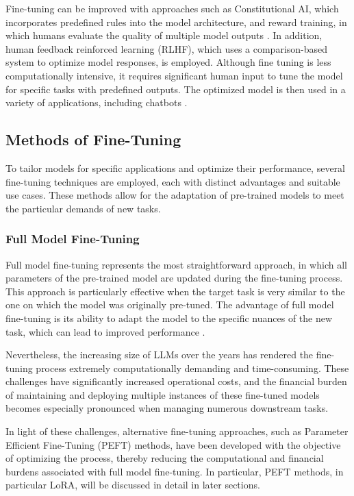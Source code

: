 Fine-tuning can be improved with approaches such as Constitutional AI, which incorporates predefined rules into the model architecture, and reward training, in which humans evaluate the quality of multiple model outputs \cite{bai2022constitutional}. In addition, human feedback reinforced learning (RLHF), which uses a comparison-based system to optimize model responses, is employed. Although fine tuning is less computationally intensive, it requires significant human input to tune the model for specific tasks with predefined outputs. The optimized model is then used in a variety of applications, including chatbots \cite{ouyang2022training}.

\subsection{Methods of Fine-Tuning}

To tailor models for specific applications and optimize their performance, several fine-tuning techniques are employed, each with distinct advantages and suitable use cases. These methods allow for the adaptation of pre-trained models to meet the particular demands of new tasks.

\subsubsection{Full Model Fine-Tuning}

Full model fine-tuning represents the most straightforward approach, in which all parameters of the pre-trained model are updated during the fine-tuning process. This approach is particularly effective when the target task is very similar to the one on which the model was originally pre-tuned. The advantage of full model fine-tuning is its ability to adapt the model to the specific nuances of the new task, which can lead to improved performance \cite{howard2018universal}.

Nevertheless, the increasing size of LLMs over the years has rendered the fine-tuning process extremely computationally demanding and time-consuming. These challenges have significantly increased operational costs, and the financial burden of maintaining and deploying multiple instances of these fine-tuned models becomes especially pronounced when managing numerous downstream tasks.

In light of these challenges, alternative fine-tuning approaches, such as Parameter Efficient Fine-Tuning (PEFT) methods, have been developed with the objective of optimizing the process, thereby reducing the computational and financial burdens associated with full model fine-tuning. In particular, PEFT methods, in particular LoRA, will be discussed in detail in later sections.

